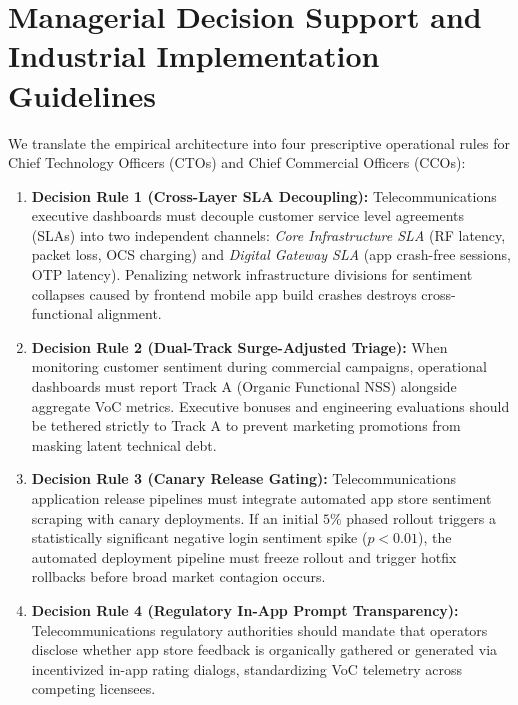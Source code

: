 \documentclass[review,12pt,authoryear]{elsarticle}
\begin{document}
\section{Managerial Decision Support and Industrial Implementation Guidelines}
\label{sec:managerial_dss}

We translate the empirical architecture into four prescriptive operational rules for Chief Technology Officers (CTOs) and Chief Commercial Officers (CCOs):
\begin{enumerate}
    \item \textbf{Decision Rule 1 (Cross-Layer SLA Decoupling):} Telecommunications executive dashboards must decouple customer service level agreements (SLAs) into two independent channels: \textit{Core Infrastructure SLA} (RF latency, packet loss, OCS charging) and \textit{Digital Gateway SLA} (app crash-free sessions, OTP latency). Penalizing network infrastructure divisions for sentiment collapses caused by frontend mobile app build crashes destroys cross-functional alignment.
    \item \textbf{Decision Rule 2 (Dual-Track Surge-Adjusted Triage):} When monitoring customer sentiment during commercial campaigns, operational dashboards must report Track A (Organic Functional NSS) alongside aggregate VoC metrics. Executive bonuses and engineering evaluations should be tethered strictly to Track A to prevent marketing promotions from masking latent technical debt.
    \item \textbf{Decision Rule 3 (Canary Release Gating):} Telecommunications application release pipelines must integrate automated app store sentiment scraping with canary deployments. If an initial $5\%$ phased rollout triggers a statistically significant negative login sentiment spike ($p < 0.01$), the automated deployment pipeline must freeze rollout and trigger hotfix rollbacks before broad market contagion occurs.
    \item \textbf{Decision Rule 4 (Regulatory In-App Prompt Transparency):} Telecommunications regulatory authorities should mandate that operators disclose whether app store feedback is organically gathered or generated via incentivized in-app rating dialogs, standardizing VoC telemetry across competing licensees.
\end{enumerate}
\end{document}
